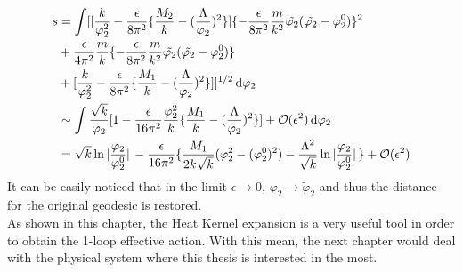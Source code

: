 \begin{align}
    \begin{split}
    s &=\int [[\frac{k}{\varphi_{2}^{2}} -\frac{\epsilon}{8\pi^{2}}\lbrace \frac{M_2}{k} - (\frac{\Lambda}{\varphi_{2}})^{2}\rbrace] \lbrace -\frac{\epsilon}{8\pi^{2}} \frac{m}{k^{2}} \tilde{\varphi_{2}}(\tilde{\varphi_{2}} -\varphi_{2}^{0}) \rbrace ^{2} \\
    & + \frac{\epsilon}{4\pi^{2}}\frac{m}{k}\lbrace -\frac{\epsilon}{8\pi^{2}} \frac{m}{k^{2}} \tilde{\varphi_{2}}(\tilde{\varphi_{2}} -\varphi_{2}^{0}) \rbrace  \\
    & + [\frac{k}{\varphi_{2}^{2}} -\frac{\epsilon}{8\pi^{2}}\lbrace \frac{M_1}{k} - (\frac{\Lambda}{\varphi_{2}})^{2}\rbrace]]^{1/2} \dd {\varphi_{2}}  \\
    &\sim \int \frac{\sqrt{k}}{\varphi_{2}} [1- \frac{\epsilon}{16\pi^{2}} \frac{\varphi_{2}^{2}}{k} \lbrace\frac{M_{1}}{k} - (\frac{\Lambda}{\varphi_{2}})^{2} \rbrace ] + \order*{\epsilon^{2}} \dd{\varphi_{2}} \\
    &= \sqrt{k} \ln\abs*{\frac{\varphi_{2}}{\varphi_{2}^{0}}} - \frac{\epsilon}{16\pi^{2}}\lbrace \frac{M_{1}}{2k\sqrt{k}}(\varphi_{2}^{2} - (\varphi_{2}^{0})^{2}) - \frac{\Lambda^{2}}{\sqrt{k}}\ln\abs*{\frac{\varphi_{2}}{\varphi_{2}^{0}}} \rbrace + \order*{\epsilon ^{2}}
    \end{split}
\end{align}
It can be easily noticed that in the limit $\epsilon \to 0$, $\varphi_{2} \to \tilde \varphi_{2}$ and thus the distance for the original geodesic is restored. \\
\indent As shown in this chapter, the Heat Kernel expansion is a very useful tool in order to obtain the 1-loop effective action. With this mean, the next chapter would deal with the physical system where this thesis is interested in the most.